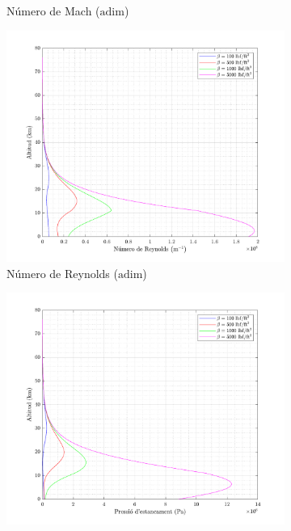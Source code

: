 \begin{figure}[ht]
\begin{subfigure}[t]{.33\textwidth}
        \captionsetup{skip=0pt}
        \caption{Número de Mach ($\mathrm{adim}$)}
    \end{subfigure}%
    \begin{subfigure}[t]{.33\textwidth}
        \centering
        \includegraphics[width=\linewidth]{imagenes/01_ballistic_graficas/reynolds_no_title.pdf}
        \captionsetup{skip=0pt}
        \caption{Número de Reynolds ($\mathrm{adim}$)}
    \end{subfigure}%
    \begin{subfigure}[t]{.33\textwidth}
        \centering
        \includegraphics[width=\linewidth]{imagenes/01_ballistic_graficas/pressio_estancament_no_title.pdf}

\end{subfigure}
\end{figure}
